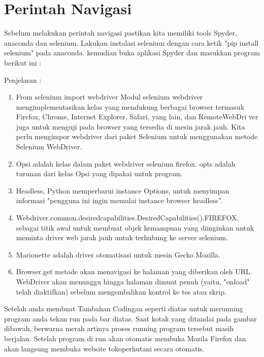 
\section{Perintah Navigasi}
Sebelum melakukan perintah navigasi pastikan kita memiliki tools Spyder, anaconda dan selenium. Lakukan instalasi selenium dengan cara ketik "pip install selenium" pada anaconda. kemudian buka aplikasi Spyder dan masukkan program berikut ini :


Penjelasan : 
\begin{enumerate}
	\item From selenium import webdriver Modul selenium webdriver mengimplementasikan kelas yang mendukung berbagai browser termasuk Firefox, Chrome, Internet Explorer, Safari, yang lain, dan RemoteWebDri	ver juga untuk menguji pada browser yang tersedia di mesin jarak jauh. Kita perlu mengimpor webdriver dari paket Selenium untuk menggunakan metode Selenium WebDriver.
	\item Opsi adalah kelas dalam paket webdriver selenium firefox. opts adalah turunan dari kelas Opsi yang dipakai untuk program.
	\item Headless, Python memperbarui instance Options, untuk menyimpan informasi "pengguna ini ingin memulai instance browser headless”.
	\item Webdriver.common.desiredcapabilities.DesiredCapabilities().FIREFOX.   sebagai titik awal untuk membuat objek kemampuan yang diinginkan untuk meminta driver web jarak jauh untuk terhubung ke server selenium.  
	\item Marionette adalah driver otomatisasi untuk mesin Gecko Mozilla.
	\item Browser.get metode akan menavigasi ke halaman yang diberikan oleh URL. WebDriver akan menunggu hingga halaman dimuat penuh (yaitu, "onload" telah diaktifkan) sebelum mengembalikan kontrol ke tes atau skrip.
\end{enumerate}

Setelah anda membuat Tambahan Codingan  seperti diatas untuk merunning program anda tekan run pada bar diatas. Saat kotak yang ditandai pada gambar dibawah, berwarna merah artinya proses running program tersebut masih berjalan. Setelah program di run akan otomatis membuka Mozila Firefox dan akan langsung membuka website tokoperhutani secara otomatis.

